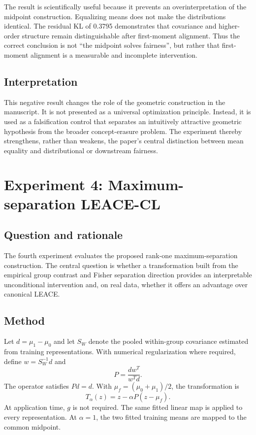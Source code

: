 The result is scientifically useful because it prevents an overinterpretation of the midpoint construction. Equalizing means does not make the distributions identical. The residual KL of 0.3795 demonstrates that covariance and higher-order structure remain distinguishable after first-moment alignment. Thus the correct conclusion is not ``the midpoint solves fairness'', but rather that first-moment alignment is a measurable and incomplete intervention.

\subsection{Interpretation}
This negative result changes the role of the geometric construction in the manuscript. It is not presented as a universal optimization principle. Instead, it is used as a falsification control that separates an intuitively attractive geometric hypothesis from the broader concept-erasure problem. The experiment thereby strengthens, rather than weakens, the paper's central distinction between mean equality and distributional or downstream fairness.

\section{Experiment 4: Maximum-separation LEACE-CL}
\label{sec:leace-cl}

\subsection{Question and rationale}
The fourth experiment evaluates the proposed rank-one maximum-separation construction. The central question is whether a transformation built from the empirical group contrast and Fisher separation direction provides an interpretable unconditional intervention and, on real data, whether it offers an advantage over canonical LEACE.

\subsection{Method}
Let $d=\mu_1-\mu_0$ and let $S_W$ denote the pooled within-group covariance estimated from training representations. With numerical regularization where required, define $w=S_W^{-1}d$ and
\begin{equation}
P=\frac{dw^T}{w^Td}.
\end{equation}
The operator satisfies $Pd=d$. With $\mu_f=(\mu_0+\mu_1)/2$, the transformation is
\begin{equation}
T_\alpha(z)=z-\alpha P(z-\mu_f).
\end{equation}
At application time, $g$ is not required. The same fitted linear map is applied to every representation. At $\alpha=1$, the two fitted training means are mapped to the common midpoint.

